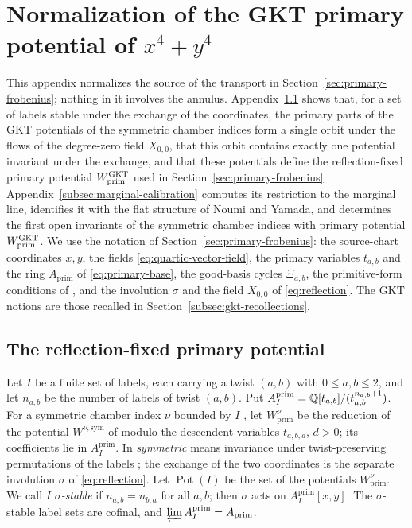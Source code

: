 \section{Normalization of the GKT primary potential of \texorpdfstring{$x^4+y^4$}{x\^{}4+y\^{}4}}
\label{app:primary-calibration}

This appendix normalizes the source of the transport in
Section~\ref{sec:primary-frobenius}; nothing in it involves the annulus.
Appendix~\ref{subsec:reflection-fixed} shows that, for a set of labels
stable under the exchange of the coordinates, the primary parts of the GKT
potentials of the symmetric chamber indices form a single orbit under the
flows of the degree-zero field $X_{0,0}$, that this orbit contains exactly
one potential invariant under the exchange, and that these potentials define
the reflection-fixed primary potential $W^{\mathrm{GKT}}_{\mathrm{prim}}$ used in
Section~\ref{sec:primary-frobenius}.
Appendix~\ref{subsec:marginal-calibration} computes its restriction to the
marginal line, identifies it with the flat structure of Noumi and Yamada, and
determines the first open invariants of the symmetric chamber indices with
primary potential $W^{\mathrm{GKT}}_{\mathrm{prim}}$.
We use the notation of Section~\ref{sec:primary-frobenius}: the source-chart
coordinates $x,y$, the fields \eqref{eq:quartic-vector-field}, the primary
variables $t_{a,b}$ and the ring $A_{\mathrm{prim}}$ of
\eqref{eq:primary-base}, the good-basis cycles $\Xi_{a,b}$, the primitive-form
conditions of \cite[Def.~4.3]{grossetal2022open}, and the involution $\sigma$
and the field $X_{0,0}$ of \eqref{eq:reflection}.  The GKT notions are those
recalled in Section~\ref{subsec:gkt-recollections}.

\subsection{The reflection-fixed primary potential}
\label{subsec:reflection-fixed}

Let $I$ be a finite set of labels, each carrying a twist
$(a,b)$ with $0\leq a,b\leq2$, and let $n_{a,b}$ be the number of labels of
twist $(a,b)$.  Put
$A^{\mathrm{prim}}_I=\mathbb Q[t_{a,b}]/(t_{a,b}^{n_{a,b}+1})$.  For a symmetric
chamber index $\nu$ bounded by $I$ \cite[Def.~3.47]{grossetal2022open}, let
$W^\nu_{\mathrm{prim}}$ be the reduction of the potential $W^{\nu,\mathrm{sym}}$
of \cite[Def.~4.12]{grossetal2022open} modulo the descendent variables
$t_{a,b,d}$, $d>0$; its coefficients lie in $A^{\mathrm{prim}}_I$.  In
\cite{grossetal2022open} \emph{symmetric} means invariance under
twist-preserving permutations of the labels
\cite[Notation~3.42]{grossetal2022open}; the exchange of the two coordinates
is the separate involution $\sigma$ of \eqref{eq:reflection}.  Let
$\operatorname{Pot}(I)$ be the set of the potentials $W^\nu_{\mathrm{prim}}$.  We
call $I$ \emph{$\sigma$-stable} if $n_{a,b}=n_{b,a}$ for all $a,b$; then
$\sigma$ acts on $A^{\mathrm{prim}}_I[x,y]$.  The $\sigma$-stable label sets
are cofinal, and $\varprojlim A^{\mathrm{prim}}_I=A_{\mathrm{prim}}$.

